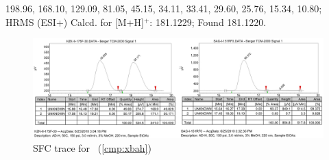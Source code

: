 198.96, 168.10, 129.09, 81.05, 45.15, 34.11, 33.41, 29.60, 25.76, 15.34, 10.80; HRMS (ESI+) Calcd.
for  [M+H]$^+$: 181.1229; Found 181.1220.
\begin{figure}[h]
\vspace{10pt}
\centering
\includegraphics[width=5.25in]{chp_singlecarbon/images/sfc/xbah_sfc.jpg}
\caption{SFC trace for \CMPxbah~(\ref{cmp:xbah})}
\vspace{-10pt}
\end{figure}

